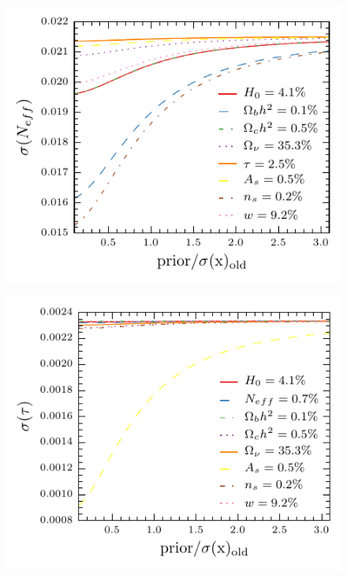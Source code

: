 \documentclass[aps,prd,reprint,superscriptaddress]{revtex4-1}
\begin{document}
\begin{figure}[htbp]
\begin{center}
\includegraphics{prior_massless_neutrinos_snow_mass.pdf}
\caption{}
\label{fig:prior_massless_neutrinos}
\end{center}
\end{figure}


\begin{figure}[htbp]
\begin{center}
\includegraphics{prior_re_optical_depth_snow_mass.pdf}
\caption{}
\label{fig:prior_re_optical_depth}
\end{center}
\end{figure}
\end{document}
